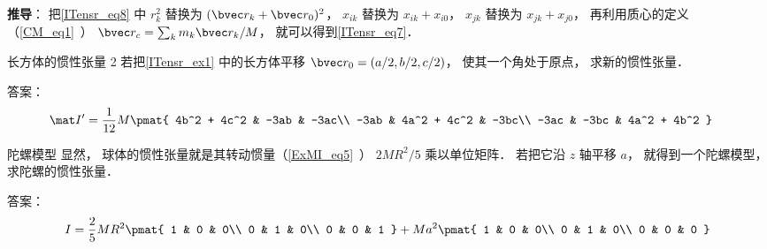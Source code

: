 \textbf{推导}： 
把\autoref{ITensr_eq8} 中 $r_k^2$ 替换为 $(\bvec r_k + \bvec r_0)^2$， $x_{ik}$ 替换为 $x_{ik} + x_{i0}$， $x_{jk}$ 替换为 $x_{jk} + x_{j0}$， 再利用质心的定义（\autoref{CM_eq1}~） $\bvec r_c = \sum_k m_k\bvec r_k/M$， 就可以得到\autoref{ITensr_eq7}．

\begin{exercise}{长方体的惯性张量 2}
若把\autoref{ITensr_ex1} 中的长方体平移 $\bvec r_0 = (a/2, b/2, c/2)$， 使其一个角处于原点， 求新的惯性张量．

答案：
\begin{equation}
\begin{aligned}
\mat I' &= \frac{1}{12} M
\pmat{
   4b^2 + 4c^2 & -3ab & -3ac\\
   -3ab & 4a^2 + 4c^2 & -3bc\\
   -3ac & -3bc & 4a^2 + 4b^2
}
\end{aligned}
\end{equation}
\end{exercise}
\begin{exercise}{陀螺模型}\label{ITensr_exe2}
显然， 球体的惯性张量就是其转动惯量（\autoref{ExMI_eq5}~） $2MR^2/5$ 乘以单位矩阵． 若把它沿 $z$ 轴平移 $a$， 就得到一个陀螺模型， 求陀螺的惯性张量．

答案：
\begin{equation}
I = \frac{2}{5}MR^2\pmat{
   1 & 0 & 0\\
   0 & 1 & 0\\
   0 & 0 & 1
} + Ma^2 \pmat{
   1 & 0 & 0\\
   0 & 1 & 0\\
   0 & 0 & 0
}\end{equation}
\end{exercise}

